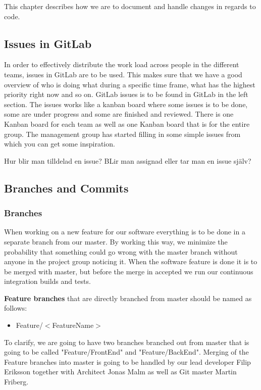 This chapter describes how we are to document and handle changes in regards to code. 

\subsection{Issues in GitLab}
In order to effectively distribute the work load across people in the different teams, issues in GitLab are to be used. This makes sure that we have a good overview of who is doing what during a specific time frame, what has the highest priority right now and so on. GitLab issues is to be found in GitLab in the left section. The issues works like a kanban board where some issues is to be done, some are under progress and some are finished and reviewed. There is one Kanban board for each team as well as one Kanban board that is for the entire group. The management group has started filling in some simple issues from which you can get some inspiration. 

Hur blir man tilldelad en issue? BLir man assignad eller tar man en issue själv? 

\subsection{Branches and Commits}

\subsubsection{Branches}
When working on a new feature for our software everything is to be done in a separate branch from our master. By working this way, we minimize the probability that something could go wrong with the master branch without anyone in the project group noticing it. When the software feature is done it is to be merged with master, but before the merge in accepted we run our continuous integration builds and tests. 

\textbf{Feature branches} that are directly branched from master should be named as follows: 
\begin{itemize}
    \item Feature/$<$FeatureName$>$
\end{itemize}
To clarify, we are going to have two branches branched out from master that is going to be called "Feature/FrontEnd" and "Feature/BackEnd". Merging of the Feature branches into master is going to be handled by our lead developer Filip Eriksson together with Architect Jonas Malm as well as Git master Martin Friberg. 



